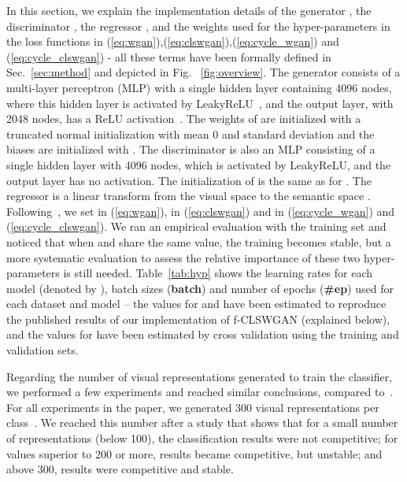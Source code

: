 \documentclass[runningheads]{llncs}
\begin{document}
In this section, we explain the implementation details of the generator , the discriminator , the regressor , and the weights used for the hyper-parameters in the loss functions in (\ref{eq:wgan}),(\ref{eq:clswgan}),(\ref{eq:cycle_wgan}) and (\ref{eq:cycle_clswgan}) - all these terms have been formally defined in Sec.~\ref{sec:method} and depicted in Fig. ~\ref{fig:overview}.
The generator consists of a multi-layer perceptron (MLP) with a single hidden layer containing 4096 nodes, where this hidden layer is activated by LeakyReLU~\cite{maas2013relu}, and the output layer, with 2048 nodes, has a ReLU activation~\cite{nair2010rectified}.
The weights of  are initialized with a truncated normal initialization with mean 0 and standard deviation  and the biases are initialized with . 
The discriminator  is also an MLP consisting of a single hidden layer with 4096 nodes, which is activated by LeakyReLU, and the output layer has no activation.  The initialization of  is the same as for .  
The regressor  is a linear transform from the visual space  to the semantic space .
Following~\cite{XianCVPR2018}, we set  in (\ref{eq:wgan}),  in (\ref{eq:clswgan}) and  in (\ref{eq:cycle_wgan}) and (\ref{eq:cycle_clswgan}). We ran an empirical evaluation with the training set and noticed that when  and  share the same value, the training becomes stable, but a more systematic evaluation to assess the relative importance of these two hyper-parameters is still needed. Table~\ref{tab:hyp} shows the learning rates for each model (denoted by ), batch sizes (\textbf{batch}) and number of epochs (\textbf{\#ep}) used for each dataset and model -- the values for  and  have been estimated to reproduce the published results of our implementation of f-CLSWGAN (explained below), and the values for  have been estimated by cross validation using the training and validation sets.

Regarding the number of visual representations generated to train the classifier, we performed a few experiments and reached similar conclusions, compared to~\cite{XianCVPR2018}. For all experiments in the paper, we generated 300 visual representations per class~\cite{XianCVPR2018}. We reached this number after a study that shows that for a small number of representations (below 100), the classification results were not competitive; for values superior to 200 or more, results became competitive, but unstable; and above 300, results were competitive and stable.
\end{document}
